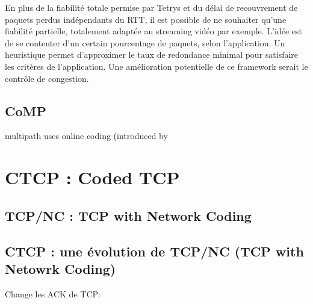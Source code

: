 \documentclass[frenchb]{article}
\begin{document}
En plus de la fiabilité totale permise par Tetrys et du délai de recouvrement de paquets perdus indépendants du RTT, il est possible de ne souhaiter qu'une fiabilité partielle, totalement adaptée au streaming vidéo par exemple. L'idée est de se contenter d'un certain pourcentage de paquets, selon l'application. Un heuristique permet d'approximer le taux de redondance minimal pour satisfaire les critères de l'application.
Une amélioration potentielle de ce framework serait le contrôle de congestion.









\subsection{CoMP}
multipath
uses online coding (introduced by

\section{CTCP : Coded TCP}


\subsection{TCP/NC : TCP with Network Coding}
\label{tcpnc}

\subsection{CTCP : une évolution de TCP/NC (TCP with Netowrk Coding)}
Change les ACK de TCP:
\end{document}
